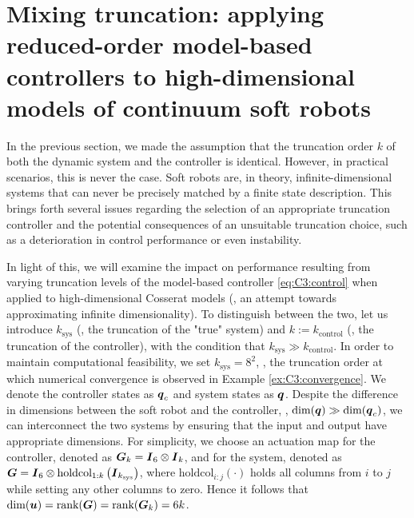 \section{Mixing truncation: applying reduced-order model-based controllers to high-dimensional models of continuum soft robots}
In the previous section, we made the assumption that the truncation order $k$ of both the dynamic system and the controller is identical. However, in practical scenarios, this is never the case. Soft robots are, in theory, infinite-dimensional systems that can never be precisely matched by a finite state description. This brings forth several issues regarding the selection of an appropriate truncation controller and the potential consequences of an unsuitable truncation choice, such as a deterioration in control performance or even instability.
%

In light of this, we will examine the impact on performance resulting from varying truncation levels of the model-based controller \eqref{eq:C3:control} when applied to high-dimensional Cosserat models (\ie, an attempt towards approximating infinite dimensionality). To distinguish between the two, let us introduce $k_{\textrm{sys}}$ (\ie, the truncation of the "true" system) and $k:= k_{\textrm{control}}$ (\ie, the truncation of the controller), with the condition that $k_{\textrm{sys}} \gg k_{\textrm{control}}$. In order to maintain computational feasibility, we set $k_\textrm{sys} = 8^2$, \ie, the truncation order at which numerical convergence is observed in Example \ref{ex:C3:convergence}. We denote the controller states as ${\boldsymbol{q}}_c$ and system states as ${\boldsymbol{q}}$. Despite the difference in dimensions between the soft robot and the controller, \ie, $\text{dim}({\boldsymbol{q}}) \gg \text{dim}({\boldsymbol{q}}_c)$, we can interconnect the two systems by ensuring that the input and output have appropriate dimensions. For simplicity, we choose an actuation map for the controller, denoted as $\boldsymbol{G}_k = {\boldsymbol{I}}_6 \otimes {\boldsymbol{I}}_k$, and for the system, denoted as $\boldsymbol{G} = {\boldsymbol{I}}_6 \otimes \textrm{holdcol}_{1:k}\left( {\boldsymbol{I}}_{k_{\textrm{sys}}}\right)$, where $\textrm{holdcol}_{i:j}(\cdot)$ holds all columns from $i$ to $j$ while setting any other columns to zero. Hence it follows that $\text{dim}({\boldsymbol{u}}) = \textnormal{rank}({\boldsymbol{G}}) = \textnormal{rank}({\boldsymbol{G}}_k) = 6k$.

